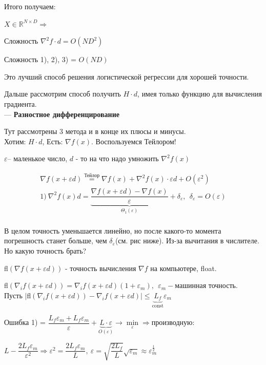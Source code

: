 Итого получаем:

$X\in \mathbb{R}^{N\times D} \Rightarrow $

Сложность $\nabla^2f\cdot d = O(ND^2)$

Сложность 1), 2), 3) = $O(ND)$

\noindent Это лучший способ решения логистической регрессии для хорошей точности.

\noindent Дальше рассмотрим способ получить $H\cdot d$, имея только функцию для вычисления градиента.
\\

\noindent --- \textbf{Разностное дифференцирование}

Тут рассмотрены 3 метода и в конце их плюсы и минусы.
\\

Хотим: $H\cdot d$, Есть: $\nabla f(x)$. Воспользуемся Тейлором!

$\varepsilon $-- маленькое число, $d$ - то на что надо умножить $\nabla^2 f(x)$

\begin{gather*}
    \nabla f (x+\varepsilon d) \overset{\text{Тейлор}}{=} \nabla f(x) + \nabla^2 f(x)\cdot \varepsilon d + O(\varepsilon^2)\\
    1)\  \nabla^2 f(x)d = \underbrace{\dfrac{\nabla f(x+\varepsilon d) - \nabla f(x)}{\varepsilon}}_{\Theta_1(\varepsilon)} + \delta_\varepsilon, \ \ \delta_\varepsilon = O(\varepsilon)\\
\end{gather*}

В целом точность уменьшается линейно, но после какого-то момента погрешность станет больше, чем $\delta_\varepsilon$(см. рис ниже). Из-за вычитания в числителе. Но какую точность брать?

fl$(\nabla f(x+\varepsilon d)) $ - точность вычисления $\nabla f$ на компьютере, float.

fl$(\nabla_i f(x+\varepsilon d)) = \nabla_i f(x+\varepsilon d) (1 + \varepsilon_m), \ \ \varepsilon_m - $машинная точность.
\\

Пусть $|$fl$(\nabla_i f(x+\varepsilon d)) - \nabla_i f(x+\varepsilon d)| \le \underbrace{L_f}_{\text{const}} \varepsilon_m$

Ошибка 1) = $\dfrac{L_f\varepsilon_m + L_f\varepsilon_m}{\varepsilon} + \underbrace{L\cdot\varepsilon}_{O(\varepsilon)} \rightarrow \underset{{\varepsilon}}{\min} \Rightarrow \text{производную:}$

$L - \dfrac{2L_f \varepsilon_m}{\varepsilon^2} \Rightarrow \varepsilon^2 = \dfrac{2L_f\varepsilon_m}{L},\ \varepsilon = \sqrt{\dfrac{2L_f}{L}}\sqrt{\varepsilon_m} \approx \varepsilon_m^{\frac{1}{2}}$
\\

